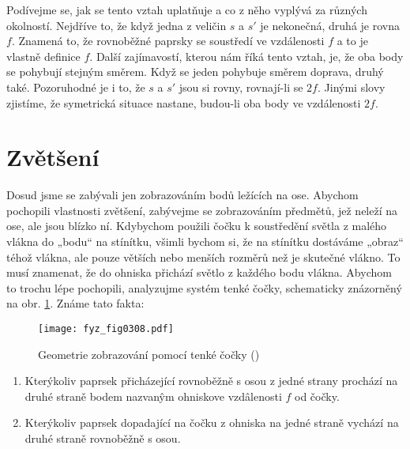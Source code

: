     Podívejme se, jak se tento vztah uplatňuje a co z něho vyplývá za různých okolností. Nejdříve 
    to, že když jedna z veličin \(s\) a \(s'\) je nekonečná, druhá je rovna \(f\). Znamená to, že 
    rovnoběžné paprsky se soustředí ve vzdálenosti \(f\) a to je vlastně definice \(f\). Další 
    zajímavostí, kterou nám říká tento vztah, je, že oba body se pohybují stejným směrem. Když se 
    jeden pohybuje směrem doprava, druhý také. Pozoruhodné je i to, že \(s\) a \(s'\) jsou si 
    rovny, rovnají-li se \(2f\). Jinými slovy zjistíme, že symetrická situace nastane, budou-li oba 
    body ve vzdálenosti \(2f\).
    
  \section{Zvětšení}\label{fyz:IchapXXVIIsecIV}
    Dosud jsme se zabývali jen zobrazováním bodů ležících na ose. Abychom pochopili vlastnosti 
    zvětšení, zabývejme se zobrazováním předmětů, jež neleží na ose, ale jsou blízko ní. Kdybychom 
    použili čočku k soustředění světla z malého vlákna do „bodu“ na stínítku, všimli bychom si, že 
    na stínítku dostáváme „obraz“ téhož vlákna, ale pouze větších nebo menších rozměrů než je 
    skutečné vlákno. To musí znamenat, že do ohniska přichází světlo z každého bodu vlákna. Abychom 
    to trochu lépe pochopili, analyzujme systém tenké čočky, schematicky znázorněný na obr. 
    \ref{fyz:fig0308}. Známe tato fakta:

    \begin{figure}[ht!] %
      \centering
      \texttt{[image: fyz\_fig0308.pdf]}
      \caption{Geometrie zobrazování pomocí tenké čočky
               (\cite[s.~355]{Feynman01})}
      \label{fyz:fig0308}
    \end{figure}

    \begin{enumerate}[noitemsep]
      \item  Kterýkoliv paprsek přicházející rovnoběžně s osou z jedné strany prochází na druhé 
             straně bodem nazvanŷm ohniskove vzdâlenosti \(f\) od čočky.
      \item  Kterýkoliv paprsek dopadající na čočku z ohniska na jedné straně vychází na druhé 
             straně rovnoběžně s osou.
    \end{enumerate}

